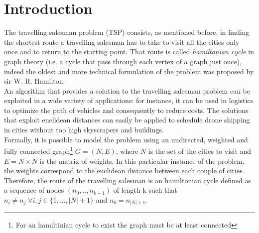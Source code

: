 \documentclass{article}
\begin{document}
\section{Introduction}
The travelling salesman problem (TSP) consists, as mentioned before, in finding the shortest route a travelling salesman has to take to visit all the cities only once and to return to the starting point. That route is called \textit{hamiltonian cycle} in graph theory (i.e. a cycle that pass through each vertex of a graph just once), indeed the oldest and more technical formulation of the problem was proposed by sir W. R. Hamilton. \\
An algorithm that provides a solution to the travelling salesman problem can be exploited in a wide variety of applications: for instance, it can be used in logistics to optimize the path of vehicles and consequently to reduce costs. The solutions that exploit euclidean distances can easily be applied to schedule drone shipping in cities without too high skyscrapers and buildings. \\
Formally, it is possible to model the problem using an undirected, weighted and fully connected graph\footnote{For an hamiltinian cycle to exist the graph must be at least connected} $G = (N,E)$, where $N$ is the set of the cities to visit and $E =  N \times N$ is the matrix of weights. In this particular instance of the problem, the weights correspond to the euclidean distance between each couple of cities.\\
Therefore, the route of the travelling salesman is an hamiltonian cycle defined as a sequence of nodes $(n_0, .., n_{k-1})$ of length k such that $n_i \neq n_j \; \forall i,j \in \{1,..., |N|+1\}$ and $n_0 = n_{|N|+1}$. \\
\end{document}
